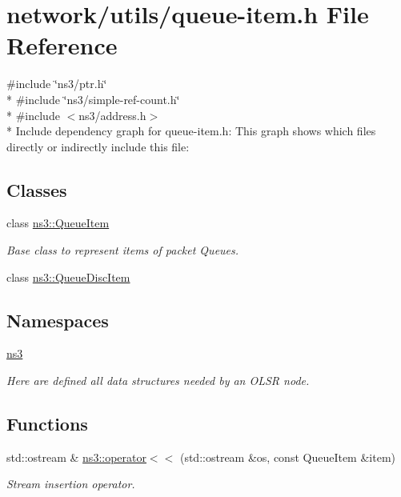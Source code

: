 \hypertarget{queue-item_8h}{}\section{network/utils/queue-\/item.h File Reference}
\label{queue-item_8h}
{\ttfamily \#include \char`\"{}ns3/ptr.\+h\char`\"{}}\\*
{\ttfamily \#include \char`\"{}ns3/simple-\/ref-\/count.\+h\char`\"{}}\\*
{\ttfamily \#include $<$ns3/address.\+h$>$}\\*
Include dependency graph for queue-\/item.h\+:
This graph shows which files directly or indirectly include this file\+:
\subsection*{Classes}
\begin{DoxyCompactItemize}
\item 
class \hyperlink{classns3_1_1QueueItem}{ns3\+::\+Queue\+Item}
\begin{DoxyCompactList}\small\item\em Base class to represent items of packet Queues. \end{DoxyCompactList}\item 
class \hyperlink{classns3_1_1QueueDiscItem}{ns3\+::\+Queue\+Disc\+Item}
\end{DoxyCompactItemize}
\subsection*{Namespaces}
\begin{DoxyCompactItemize}
\item 
 \hyperlink{namespacens3}{ns3}
\begin{DoxyCompactList}\small\item\em Here are defined all data structures needed by an O\+L\+SR node. \end{DoxyCompactList}\end{DoxyCompactItemize}
\subsection*{Functions}
\begin{DoxyCompactItemize}
\item 
std\+::ostream \& \hyperlink{namespacens3_ab62953d425e1cc0707cfed90a65300c2}{ns3\+::operator$<$$<$} (std\+::ostream \&os, const Queue\+Item \&item)
\begin{DoxyCompactList}\small\item\em Stream insertion operator. \end{DoxyCompactList}\end{DoxyCompactItemize}
